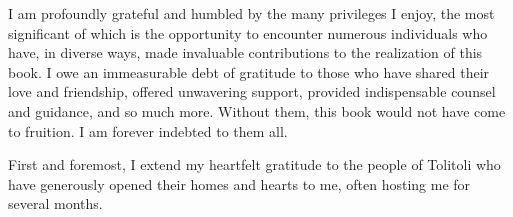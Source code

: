 \addchap{\lsAcknowledgementTitle} 




I am profoundly grateful and humbled by the many privileges I enjoy, the most significant of which is the opportunity to encounter numerous individuals who have, in diverse ways, made invaluable contributions to the realization of this book. I owe an immeasurable debt of gratitude to those who have shared their love and friendship, offered unwavering support, provided indispensable counsel and guidance, and so much more. Without them, this book would not have come to fruition. I am forever indebted to them all.


First and foremost, I extend my heartfelt gratitude to the people of Tolitoli who have generously opened their homes and hearts to me, often hosting me for  several months. 

%
%

